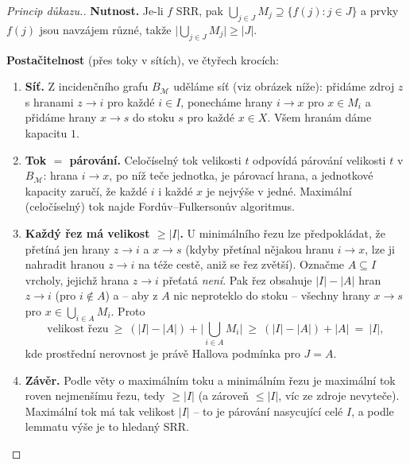\documentclass[11pt,a4paper]{article}
\newcommand{\Mcal}{\mathcal{M}}
\begin{document}
\begin{proof}[Princip důkazu.]
\textbf{Nutnost.} Je-li $f$ SRR, pak $\bigcup_{j\in J}M_j\supseteq\{f(j):j\in J\}$ a prvky $f(j)$ jsou navzájem různé, takže $\big|\bigcup_{j\in J}M_j\big|\ge|J|$.

\smallskip
\textbf{Postačitelnost} (přes toky v sítích), ve čtyřech krocích:
\begin{enumerate}[label=(\arabic*)]
  \item \textbf{Síť.} Z incidenčního grafu $B_{\Mcal}$ uděláme síť (viz obrázek níže): přidáme zdroj $z$ s hranami $z\to i$ pro každé $i\in I$, ponecháme hrany $i\to x$ pro $x\in M_i$ a přidáme hrany $x\to s$ do stoku $s$ pro každé $x\in X$. Všem hranám dáme kapacitu $1$.
  \item \textbf{Tok $=$ párování.} Celočíselný tok velikosti $t$ odpovídá párování velikosti $t$ v $B_{\Mcal}$: hrana $i\to x$, po níž teče jednotka, je párovací hrana, a jednotkové kapacity zaručí, že každé $i$ i každé $x$ je nejvýše v jedné. Maximální (celočíselný) tok najde Fordův--Fulkersonův algoritmus.
  \item \textbf{Každý řez má velikost $\ge|I|$.} U minimálního řezu lze předpokládat, že přetíná jen hrany $z\to i$ a $x\to s$ (kdyby přetínal nějakou hranu $i\to x$, lze ji nahradit hranou $z\to i$ na téže cestě, aniž se řez zvětší). Označme $A\subseteq I$ vrcholy, jejichž hrana $z\to i$ přeťatá \emph{není}. Pak řez obsahuje $|I|-|A|$ hran $z\to i$ (pro $i\notin A$) a -- aby z $A$ nic neproteklo do stoku -- všechny hrany $x\to s$ pro $x\in\bigcup_{i\in A}M_i$. Proto
    \[
    \text{velikost řezu}\ \ge\ (|I|-|A|)+\Big|\bigcup_{i\in A}M_i\Big|\ \ge\ (|I|-|A|)+|A|\ =\ |I|,
    \]
    kde prostřední nerovnost je právě Hallova podmínka pro $J=A$.
  \item \textbf{Závěr.} Podle věty o maximálním toku a minimálním řezu je maximální tok roven nejmenšímu řezu, tedy $\ge|I|$ (a zároveň $\le|I|$, víc ze zdroje nevyteče). Maximální tok má tak velikost $|I|$ -- to je párování nasycující celé $I$, a podle lemmatu výše je to hledaný SRR.
\end{enumerate}
\end{proof}
\end{document}

